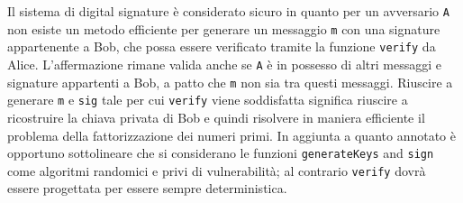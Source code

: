 Il sistema di digital signature è considerato sicuro in quanto per un avversario \texttt{A} non esiste un metodo efficiente per generare un messaggio \texttt{m} con una signature appartenente a Bob, che possa essere verificato tramite la funzione \texttt{verify} da Alice. L'affermazione rimane valida anche se \texttt{A} è in possesso di altri messaggi e signature appartenti a Bob, a patto che \texttt{m} non sia tra questi messaggi.\newline
Riuscire a generare \texttt{m} e \texttt{sig} tale per cui \texttt{verify} viene soddisfatta significa riuscire a ricostruire la chiava privata di Bob e quindi risolvere in maniera efficiente il problema della fattorizzazione dei numeri primi.\newline\newline
In aggiunta a quanto annotato è opportuno sottolineare che si considerano le funzioni \texttt{generateKeys} and \texttt{sign} come algoritmi randomici e privi di vulnerabilità; al contrario \texttt{verify} dovrà essere progettata per essere sempre deterministica.

